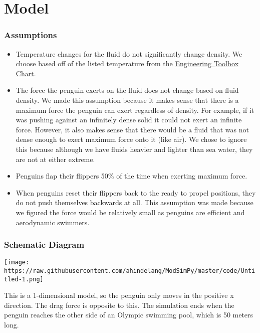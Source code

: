 \documentclass[11pt]{article}
\makeatletter
\def\maxwidth{\ifdim\Gin@nat@width>\linewidth\linewidth
    \else\Gin@nat@width\fi}
\let\Oldincludegraphics\includegraphics
\renewcommand{\includegraphics}[1]{\Oldincludegraphics[width=.8\maxwidth]{#1}}
\providecommand{\tightlist}{%
      \setlength{\itemsep}{0pt}\setlength{\parskip}{0pt}}
\makeatother
\begin{document}
    \hypertarget{model}{%
\section{Model}\label{model}}

    \hypertarget{assumptions}{%
\subsubsection{Assumptions}\label{assumptions}}

\begin{itemize}
\tightlist
\item
  Temperature changes for the fluid do not significantly change density.
  We choose based off of the listed temperature from the
  \href{https://www.engineeringtoolbox.com/liquids-densities-d_743.html}{Engineering
  Toolbox Chart}.
\item
  The force the penguin exerts on the fluid does not change based on
  fluid density. We made this assumption because it makes sense that
  there is a maximum force the penguin can exert regardless of density.
  For example, if it was pushing against an infinitely dense solid it
  could not exert an infinite force. However, it also makes sense that
  there would be a fluid that was not dense enough to exert maximum
  force onto it (like air). We chose to ignore this because although we
  have fluids heavier and lighter than sea water, they are not at either
  extreme.
\item
  Penguins flap their flippers 50\% of the time when exerting maximum
  force.
\item
  When penguins reset their flippers back to the ready to propel
  positions, they do not push themselves backwards at all. This
  assumption was made because we figured the force would be relatively
  small as penguins are efficient and aerodynamic swimmers.
\end{itemize}

    \hypertarget{schematic-diagram}{%
\subsubsection{Schematic Diagram}\label{schematic-diagram}}

    \texttt{[image: https://raw.githubusercontent.com/ahindelang/ModSimPy/master/code/Untitled-1.png]}

This is a 1-dimensional model, so the penguin only moves in the positive
x direction. The drag force is opposite to this. The simulation ends
when the penguin reaches the other side of an Olympic swimming pool,
which is 50 meters long.
\end{document}
